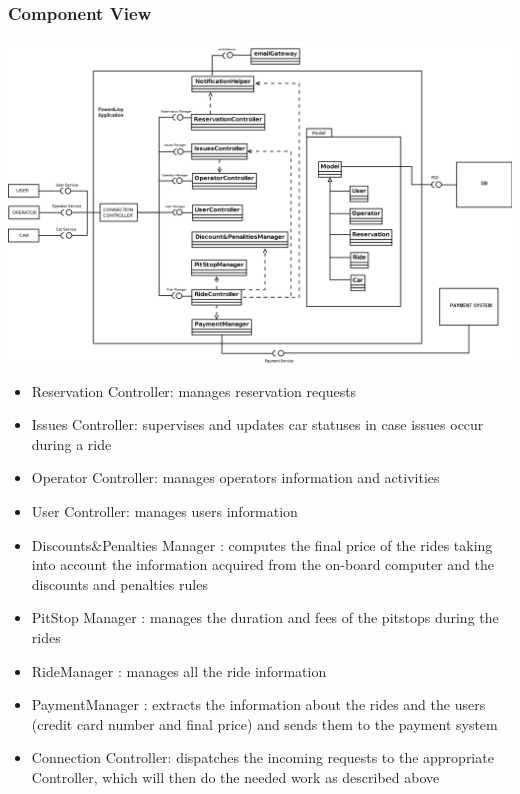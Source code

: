 \documentclass{article}
\begin{document}
\begin{flushleft}
\break
\subsubsection{Component View}
 
\vspace{0.5cm}

\includegraphics[scale=0.3]{FinalComponentView} 

\vspace{0.5cm}
\begin {itemize}
\item Reservation Controller: manages reservation requests
\item Issues Controller:  supervises  and updates car statuses in case issues occur during a ride
\item Operator Controller: manages operators information and activities
\item User Controller: manages users information 
\item Discounts\&Penalties Manager : computes the final price of the rides  taking into account the information acquired from the on-board computer and the discounts and penalties rules
\item PitStop Manager : manages the duration and fees of the pitstops during the rides 
\item RideManager : manages all the ride information
\item PaymentManager : extracts the information about the rides and the users (credit card number and final price) and sends them to the payment system
\item Connection Controller: dispatches the incoming requests to the appropriate Controller, which will then do the needed work as described above


\end{itemize}
\end{flushleft}
\end{document}
